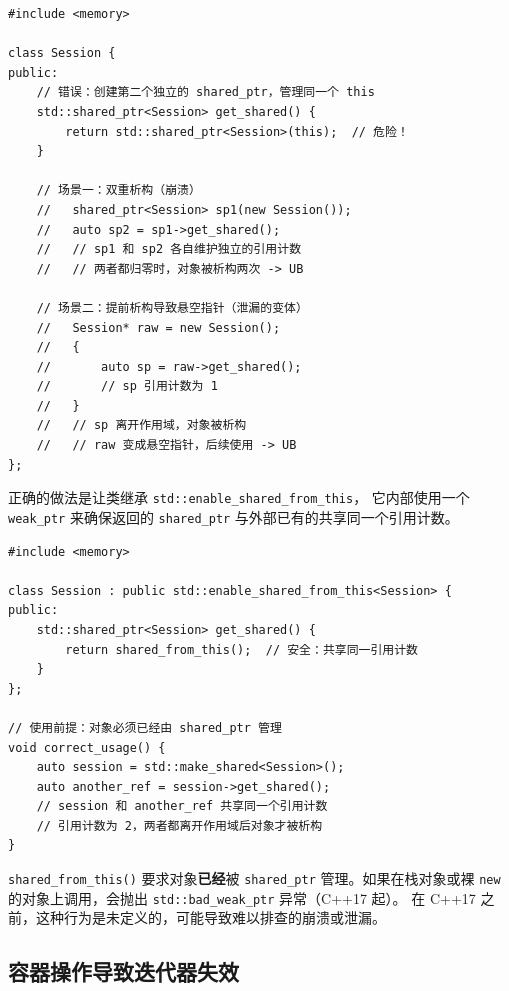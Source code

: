 \documentclass[12pt,a4paper,fontset=fandol]{ctexbook}
\begin{document}
\begin{lstlisting}[style=cppstyle, caption={从 this 构造 shared\_ptr 的两种泄漏/崩溃模式}]
#include <memory>

class Session {
public:
    // 错误：创建第二个独立的 shared_ptr，管理同一个 this
    std::shared_ptr<Session> get_shared() {
        return std::shared_ptr<Session>(this);  // 危险！
    }

    // 场景一：双重析构（崩溃）
    //   shared_ptr<Session> sp1(new Session());
    //   auto sp2 = sp1->get_shared();
    //   // sp1 和 sp2 各自维护独立的引用计数
    //   // 两者都归零时，对象被析构两次 -> UB

    // 场景二：提前析构导致悬空指针（泄漏的变体）
    //   Session* raw = new Session();
    //   {
    //       auto sp = raw->get_shared();
    //       // sp 引用计数为 1
    //   }
    //   // sp 离开作用域，对象被析构
    //   // raw 变成悬空指针，后续使用 -> UB
};
\end{lstlisting}

\noindent 正确的做法是让类继承 \texttt{std::enable\_shared\_from\_this}，
它内部使用一个 \texttt{weak\_ptr} 来确保返回的 \texttt{shared\_ptr}
与外部已有的共享同一个引用计数。

\begin{lstlisting}[style=cppstyle, caption={enable\_shared\_from\_this 的正确用法}]
#include <memory>

class Session : public std::enable_shared_from_this<Session> {
public:
    std::shared_ptr<Session> get_shared() {
        return shared_from_this();  // 安全：共享同一引用计数
    }
};

// 使用前提：对象必须已经由 shared_ptr 管理
void correct_usage() {
    auto session = std::make_shared<Session>();
    auto another_ref = session->get_shared();
    // session 和 another_ref 共享同一个引用计数
    // 引用计数为 2，两者都离开作用域后对象才被析构
}
\end{lstlisting}

\begin{warning}[title={使用前提}]
\texttt{shared\_from\_this()} 要求对象\textbf{已经}被 \texttt{shared\_ptr}
管理。如果在栈对象或裸 \texttt{new} 的对象上调用，会抛出
\texttt{std::bad\_weak\_ptr} 异常（C++17 起）。
在 C++17 之前，这种行为是未定义的，可能导致难以排查的崩溃或泄漏。
\end{warning}

\subsection{容器操作导致迭代器失效}
\end{document}

